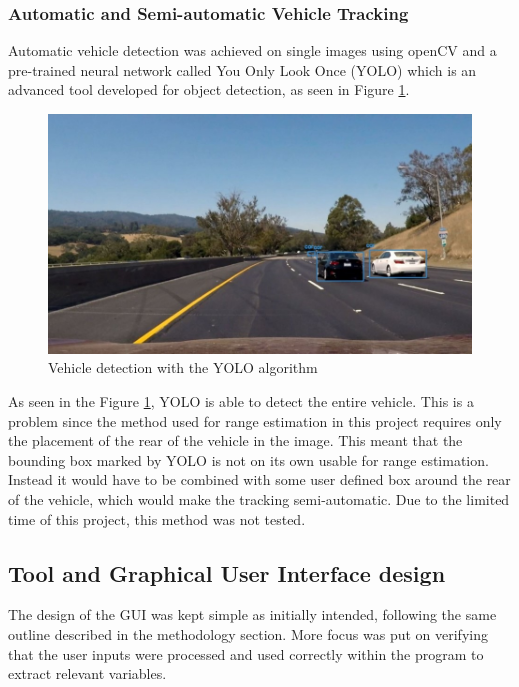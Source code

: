 \subsubsection{Automatic and Semi-automatic Vehicle Tracking}
\label{sec:3.6.2}
Automatic vehicle detection was achieved on single images using openCV and a pre-trained neural network called You Only Look Once (YOLO) which is an advanced tool developed for object detection\cite{Redmon_2016_CVPR}, as seen in Figure \ref{fig:yolo_image}.

\begin{figure}[H]
    \centering
    \includegraphics[width=\textwidth]{Figures/yolo_image.jpg}
    \caption{Vehicle detection with the YOLO algorithm}
    \label{fig:yolo_image}
\end{figure}

As seen in the Figure \ref{fig:yolo_image}, YOLO is able to detect the entire vehicle. This is a problem since the method used for range estimation in this project requires only the placement of the rear of the vehicle in the image. This meant that the bounding box marked by YOLO is not on its own usable for range estimation. Instead it would have to be combined with some user defined box around the rear of the vehicle, which would make the tracking semi-automatic. Due to the limited time of this project, this method was not tested.


\subsection{Tool and Graphical User Interface design}

The design of the GUI was kept simple as initially intended, following the same outline described in the methodology section. More focus was put on verifying that the user inputs were processed and used correctly within the program to extract relevant variables. 

